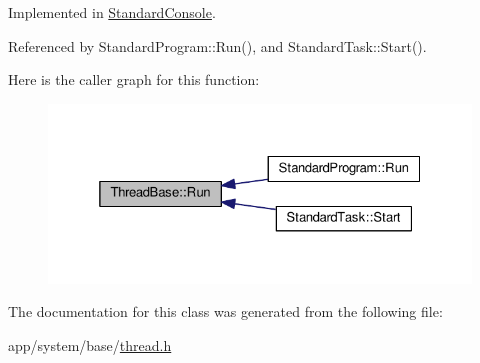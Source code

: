 Implemented in \hyperlink{classStandardConsole_a9380023bba612b816b134589130bb254}{Standard\+Console}.



Referenced by Standard\+Program\+::\+Run(), and Standard\+Task\+::\+Start().



Here is the caller graph for this function\+:\nopagebreak
\begin{figure}[H]
\begin{center}
\leavevmode
\includegraphics[width=325pt]{classThreadBase_a795d258c1f40c123859d0e83dce6a0ad_icgraph}
\end{center}
\end{figure}




The documentation for this class was generated from the following file\+:\begin{DoxyCompactItemize}
\item 
app/system/base/\hyperlink{thread_8h}{thread.\+h}\end{DoxyCompactItemize}
